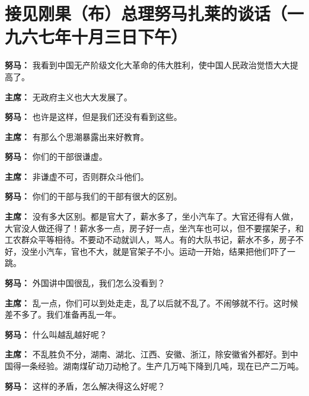 \section[接见刚果（布）总理努马扎莱的谈话（一九六七年十月三日下午）]{接见刚果（布）总理努马扎莱的谈话（一九六七年十月三日下午）}

\begin{duihua}

\item[\textbf{努马：}] 我看到中国无产阶级文化大革命的伟大胜利，使中国人民政治觉悟大大提高了。

\item[\textbf{主席：}] 无政府主义也大大发展了。

\item[\textbf{努马：}] 也许是这样，但是我们还没有看到这些。

\item[\textbf{主席：}] 有那么个思潮暴露出来好教育。

\item[\textbf{努马：}] 你们的干部很谦虚。

\item[\textbf{主席：}] 非谦虚不可，否则群众斗他们。

\item[\textbf{努马：}] 你们的干部与我们的干部有很大的区别。

\item[\textbf{主席：}] 没有多大区别。都是官大了，薪水多了，坐小汽车了。大官还得有人做，大官没人做还得了！薪水多一点，房子好一点，坐汽车也可以，但不要摆架子，和工农群众平等相待。不要动不动就训人，骂人。有的大队书记，薪水不多，房子不好，没坐小汽车，官也不大，就是官架子不小。运动一开始，结果把他们吓了一跳。

\item[\textbf{努马：}] 外国讲中国很乱，我们怎么没看到？

\item[\textbf{主席：}] 乱一点，你们可以到处走走，乱了以后就不乱了。不闹够就不行。这时候差不多了。我们准备再乱一年。

\item[\textbf{努马：}] 什么叫越乱越好呢？

\item[\textbf{主席：}] 不乱胜负不分，湖南、湖北、江西、安徽、浙江，除安徽省外都好。到中国得一条经验。湖南煤矿动刀动枪了。生产几万吨下降到几吨，现在已产二万吨。

\item[\textbf{努马：}] 这样的矛盾，怎么解决得这么好呢？


\end{duihua}
